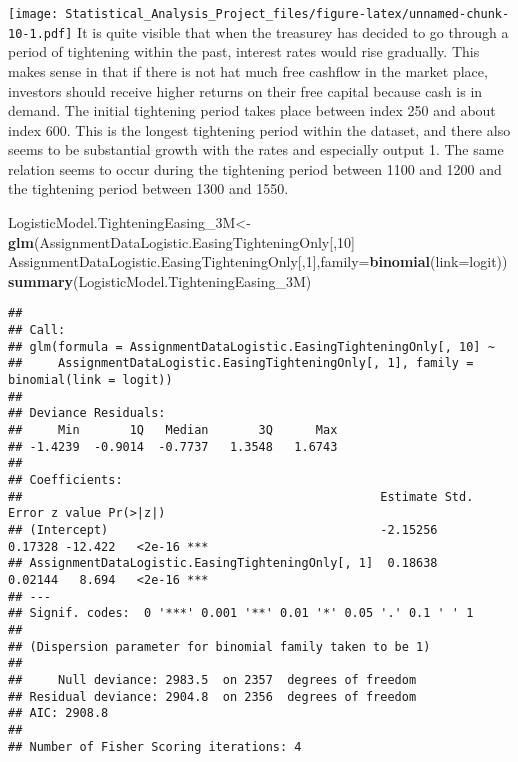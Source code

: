 \documentclass[]{article}
\newenvironment{Shaded}{\begin{snugshade}}{\end{snugshade}}
\newcommand{\KeywordTok}[1]{\textcolor[rgb]{0.13,0.29,0.53}{\textbf{#1}}}
\newcommand{\DataTypeTok}[1]{\textcolor[rgb]{0.13,0.29,0.53}{#1}}
\newcommand{\DecValTok}[1]{\textcolor[rgb]{0.00,0.00,0.81}{#1}}
\newcommand{\StringTok}[1]{\textcolor[rgb]{0.31,0.60,0.02}{#1}}
\newcommand{\OperatorTok}[1]{\textcolor[rgb]{0.81,0.36,0.00}{\textbf{#1}}}
\newcommand{\NormalTok}[1]{#1}
\begin{document}
\texttt{[image: Statistical\_Analysis\_Project\_files/figure-latex/unnamed-chunk-10-1.pdf]}
It is quite visible that when the treasurey has decided to go through a
period of tightening within the past, interest rates would rise
gradually. This makes sense in that if there is not hat much free
cashflow in the market place, investors should receive higher returns on
their free capital because cash is in demand. The initial tightening
period takes place between index 250 and about index 600. This is the
longest tightening period within the dataset, and there also seems to be
substantial growth with the rates and especially output 1. The same
relation seems to occur during the tightening period between 1100 and
1200 and the tightening period between 1300 and 1550.

\begin{Shaded}
\begin{Highlighting}[]
\NormalTok{LogisticModel.TighteningEasing_3M<-}\KeywordTok{glm}\NormalTok{(AssignmentDataLogistic.EasingTighteningOnly[,}\DecValTok{10}\NormalTok{]}\OperatorTok{~}
\StringTok{                                      }\NormalTok{AssignmentDataLogistic.EasingTighteningOnly[,}\DecValTok{1}\NormalTok{],}\DataTypeTok{family=}\KeywordTok{binomial}\NormalTok{(}\DataTypeTok{link=}\NormalTok{logit))}
\KeywordTok{summary}\NormalTok{(LogisticModel.TighteningEasing_3M)}
\end{Highlighting}
\end{Shaded}

\begin{verbatim}
## 
## Call:
## glm(formula = AssignmentDataLogistic.EasingTighteningOnly[, 10] ~ 
##     AssignmentDataLogistic.EasingTighteningOnly[, 1], family = binomial(link = logit))
## 
## Deviance Residuals: 
##     Min       1Q   Median       3Q      Max  
## -1.4239  -0.9014  -0.7737   1.3548   1.6743  
## 
## Coefficients:
##                                                  Estimate Std. Error z value Pr(>|z|)    
## (Intercept)                                      -2.15256    0.17328 -12.422   <2e-16 ***
## AssignmentDataLogistic.EasingTighteningOnly[, 1]  0.18638    0.02144   8.694   <2e-16 ***
## ---
## Signif. codes:  0 '***' 0.001 '**' 0.01 '*' 0.05 '.' 0.1 ' ' 1
## 
## (Dispersion parameter for binomial family taken to be 1)
## 
##     Null deviance: 2983.5  on 2357  degrees of freedom
## Residual deviance: 2904.8  on 2356  degrees of freedom
## AIC: 2908.8
## 
## Number of Fisher Scoring iterations: 4
\end{verbatim}
\end{document}
